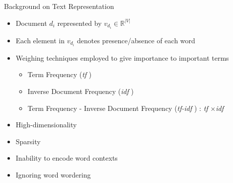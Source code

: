 \documentclass[10pt]{beamer}
\newcommand{\todo}[1]{\textcolor{red}{\textbf{TODO:} #1}}
\begin{document}
\begin{frame}{Background on Text Representation}
\vfill
{}
\begin{itemize}
	\vfill\item<2-> Document $d_{i}$ represented by $v_{d_{i}} \in \mathbb{R}^{|V|}$
	\vfill\item<3-> Each element in $v_{d_{i}}$ denotes presence/absence of each word
	\vfill\item<4-> Weighing techniques employed to give importance to important terms
	\begin{itemize}
		\vfill\item<5-> Term Frequency (\emph{tf} )
		\vfill\item<6-> Inverse Document Frequency (\emph{idf} )
		\vfill\item<7-> Term Frequency - Inverse Document Frequency (\emph{tf-idf} ) : \emph{tf} $\times$\emph{idf}
	\end{itemize}
\end{itemize}
\vfill
{}
\begin{itemize}
	\vfill\item<9-> High-dimensionality
	\vfill\item<10-> Sparsity
	\vfill\item<11-> Inability to encode word contexts
	\vfill\item<12-> Ignoring word wordering
\end{itemize}
\vfill
\end{frame}


\end{document}
